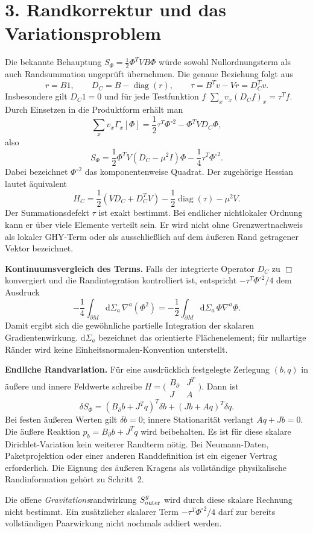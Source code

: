 \documentclass[10pt,a4paper]{article}
\newcommand{\dd}{\mathrm d}
\newcommand{\sect}[1]{\section*{\color{navy}#1}}
\begin{document}
\newpage
\sect{3. Randkorrektur und das Variationsproblem}
Die bekannte Behauptung $S_\Phi=\frac12\Phi^TVB\Phi$ würde sowohl
Nullordnungsterm als auch Randsummation ungeprüft übernehmen. Die genaue
Beziehung folgt aus
\[
r=B1,\qquad D_C=B-\operatorname{diag}(r),\qquad
\tau=B^Tv-Vr=D_C^Tv.
\]
Insbesondere gilt $D_C1=0$ und für jede Testfunktion $f$
$\sum_xv_x(D_Cf)_x=\tau^Tf$. Durch Einsetzen in die Produktform erhält man
\[
\sum_xv_x\Gamma_x[\Phi]=
\frac12\tau^T\Phi^{\circ2}-\Phi^TVD_C\Phi,
\]
also
\[
\boxed{S_\Phi=
\frac12\Phi^TV(D_C-\mu^2I)\Phi
-\frac14\tau^T\Phi^{\circ2}.}
\]
Dabei bezeichnet $\Phi^{\circ2}$ das komponentenweise Quadrat.
Der zugehörige Hessian lautet äquivalent
\[
H_C=\frac12(VD_C+D_C^TV)
-\frac12\operatorname{diag}(\tau)-\mu^2V.
\]
Der Summationsdefekt $\tau$ ist exakt bestimmt. Bei endlicher nichtlokaler
Ordnung kann er über viele Elemente verteilt sein. Er wird nicht ohne
Grenzwertnachweis als lokaler GHY-Term oder als ausschließlich auf dem
äußeren Rand getragener Vektor bezeichnet.

\textbf{Kontinuumsvergleich des Terms.} Falls der integrierte Operator
$D_C$ zu $\Box$ konvergiert und die Randintegration kontrolliert ist,
entspricht $-\tau^T\Phi^{\circ2}/4$ dem Ausdruck
\[
-\frac14\int_{\partial M}\dd\Sigma_a\,\nabla^a(\Phi^2)
=-\frac12\int_{\partial M}\dd\Sigma_a\,\Phi\nabla^a\Phi.
\]
Damit ergibt sich die gewöhnliche partielle Integration der skalaren
Gradientenwirkung. $\dd\Sigma_a$ bezeichnet das orientierte Flächenelement;
für nullartige Ränder wird keine Einheitsnormalen-Konvention unterstellt.

\textbf{Endliche Randvariation.} Für eine ausdrücklich festgelegte Zerlegung
$(b,q)$ in äußere und innere Feldwerte schreibe
$H=\bigl(\begin{smallmatrix}B_\partial&J^T\\J&A\end{smallmatrix}\bigr)$.
Dann ist
\[
\delta S_\Phi=(B_\partial b+J^Tq)^T\delta b+(Jb+Aq)^T\delta q.
\]
Bei festen äußeren Werten gilt $\delta b=0$; innere Stationarität verlangt
$Aq+Jb=0$. Die äußere Reaktion $p_b=B_\partial b+J^Tq$ wird beibehalten.
Es ist für diese skalare Dirichlet-Variation kein weiterer Randterm nötig.
Bei Neumann-Daten, Paketprojektion oder einer anderen Randdefinition ist
ein eigener Vertrag erforderlich. Die Eignung des äußeren Kragens als
vollständige physikalische Randinformation gehört zu Schritt~2.

Die offene \emph{Gravitations}randwirkung $S^g_{\rm outer}$ wird durch
diese skalare Rechnung nicht bestimmt. Ein zusätzlicher skalarer Term
$-\tau^T\Phi^{\circ2}/4$ darf zur bereits vollständigen Paarwirkung nicht
nochmals addiert werden.
\end{document}
